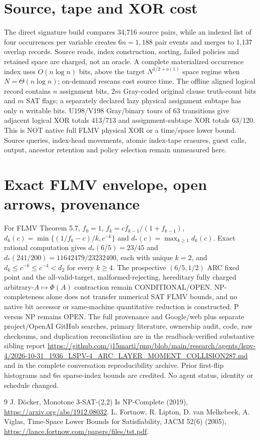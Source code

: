 \documentclass[11pt]{article}
\begin{document}
\section{Source, tape and XOR cost}
The direct signature build compares 34,716 source pairs, while an indexed list of four occurrences per variable creates $6n=1,188$ pair events and merges to 1,137 overlap records. Source reads, index construction, sorting, failed policies and retained space are charged, not an oracle. A complete materialized occurrence index uses $O(n\log n)$ bits, above the target $N^{1/2+o(1)}$ space regime when $N=\Theta(n\log n)$; on-demand rescans cost source time. The offline aligned logical record contains $n$ assignment bits, $2m$ Gray-coded original clause truth-count bits and $m$ SAT flags; a separately declared lazy physical assignment subtape has only $n$ writable bits. U198/V198 Gray/binary tours of 63 transitions give adjacent logical XOR totals 413/713 and assignment-subtape XOR totals 63/120. This is NOT native full FLMV physical XOR or a time/space lower bound. Source queries, index-head movements, atomic index-tape erasures, guest calls, output, ancestor retention and policy selection remain unmeasured here.
\section{Exact FLMV envelope, open arrows, provenance}
For FLMV Theorem 5.7, $f_0=1$, $f_k=cf_{k-1}/(1+f_{k-1})$, $d_k(c)=\min\{(1/f_k-c)/k,c^{-k}\}$ and $d_*(c)=\max_{k\ge1}d_k(c)$. Exact rational computation gives $d_*(6/5)=23/45$ and $d_*(241/200)=11642479/23232400$, each with unique $k=2$, and $d_k\le c^{-k}\le c^{-4}<d_2$ for every $k\ge4$. The prospective $(6/5,1/2)$ ARC fixed point and the all-valid-target, malformed-rejecting, hereditary fully charged arbitrary-$A\mapsto\Phi(A)$ contraction remain CONDITIONAL/OPEN. NP-completeness alone does not transfer numerical SAT FLMV bounds, and no native bit accessor or same-machine quantitative reduction is constructed. P versus NP remains OPEN.
The full provenance and Google/web plus separate project/OpenAI GitHub searches, primary literature, ownership audit, code, raw checksums, and duplication reconciliation are in the readback-verified substantive sibling report \url{https://github.com/j15marti/pnp/blob/main/research/agents/lspv-4/2026-10-31_1936_LSPV-4_ARC_LAYER_MOMENT_COLLISION287.md} and in the complete conversation reproducibility archive. Prior first-flip histograms and $6n$ sparse-index bounds are credited. No agent status, identity or schedule changed.
\begin{thebibliography}{9}
 J. D\"ocker, Monotone 3-SAT-(2,2) Is NP-Complete (2019), \url{https://arxiv.org/abs/1912.08032}.
 L. Fortnow, R. Lipton, D. van Melkebeek, A. Viglas, Time-Space Lower Bounds for Satisfiability, JACM 52(6) (2005), \url{https://lance.fortnow.com/papers/files/tst.pdf}.
\end{thebibliography}
\end{document}
